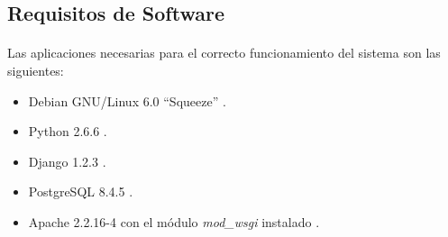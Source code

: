 \subsection{Requisitos de Software}

  \paragraph{}Las aplicaciones necesarias para el correcto funcionamiento del
  sistema son las siguientes:

  \begin{itemize}
   \item Debian GNU/Linux 6.0 ``Squeeze'' \cite{debian}.
   \item Python 2.6.6 \cite{python}.
   \item Django 1.2.3 \cite{django}.
   \item PostgreSQL 8.4.5 \cite{postgresql}.
   \item Apache 2.2.16-4 con el módulo \textit{mod\_wsgi} instalado
   \cite{apache}.
  \end{itemize}
